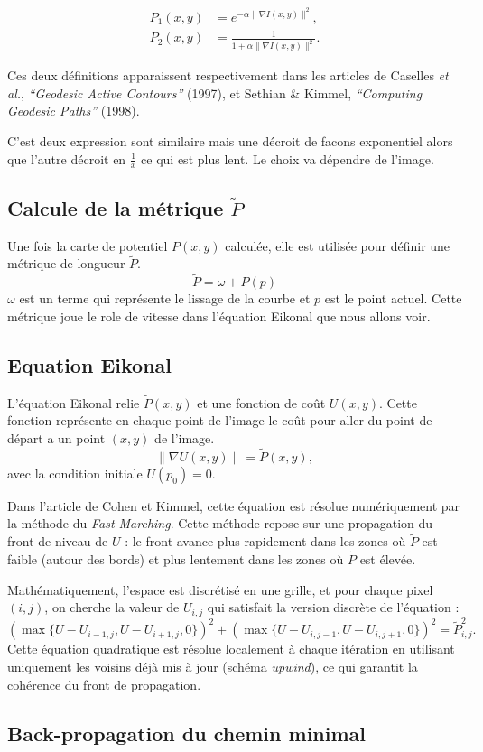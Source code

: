 \documentclass{article}
\begin{document}
\begin{equation}
\begin{aligned}
P_1(x,y) &= e^{-\alpha \|\nabla I(x,y)\|^2}, \\
P_2(x,y) &= \frac{1}{1 + \alpha \|\nabla I(x,y)\|^2}.
\end{aligned}
\end{equation}

Ces deux définitions apparaissent respectivement dans les articles de  
Caselles \textit{et al.}, \textit{“Geodesic Active Contours”} (1997), et  
Sethian \& Kimmel, \textit{“Computing Geodesic Paths”} (1998).

C'est deux expression sont similaire mais une décroit de facons exponentiel 
alors que l'autre décroit en $\frac{1}{x}$ ce qui est plus lent. Le choix va
dépendre de l'image. 

\subsection{Calcule de la métrique $\tilde{P}$}
Une fois la carte de potentiel $P(x,y)$ calculée, elle est utilisée pour définir 
une métrique de longueur $\tilde{P}$. 
\begin{equation}
\tilde{P} = \omega + P(p)
\end{equation}
$\omega$ est un terme qui représente le lissage de la courbe et $p$ est le point actuel.
Cette métrique joue le role de vitesse dans l'équation Eikonal que nous allons voir. 


\subsection{Equation Eikonal}
L'équation Eikonal relie $\tilde{P}(x,y)$ et une fonction de coût $U(x,y)$. Cette fonction
représente en chaque point de l'image le coût pour aller du point de départ a un point $(x,y)$
de l'image.
\begin{equation}
\|\nabla U(x,y)\| = \tilde{P}(x,y),
\end{equation}
avec la condition initiale $U(p_0)=0$.

Dans l’article de Cohen et Kimmel, cette équation est résolue numériquement
par la méthode du \textit{Fast Marching}.
Cette méthode repose sur une propagation du front de niveau de $U$ :
le front avance plus rapidement dans les zones où $\tilde{P}$ est faible (autour des bords)
et plus lentement dans les zones où $\tilde{P}$ est élevée.

Mathématiquement, l’espace est discrétisé en une grille, et pour chaque pixel $(i,j)$,
on cherche la valeur de $U_{i,j}$ qui satisfait la version discrète de l’équation :
\begin{equation}
(\max\{U - U_{i-1,j}, U - U_{i+1,j}, 0\})^2 + 
(\max\{U - U_{i,j-1}, U - U_{i,j+1}, 0\})^2 = \tilde{P}_{i,j}^2.
\end{equation}
Cette équation quadratique est résolue localement à chaque itération
en utilisant uniquement les voisins déjà mis à jour (schéma \textit{upwind}),
ce qui garantit la cohérence du front de propagation.

\subsection{Back-propagation du chemin minimal}
\end{document}
